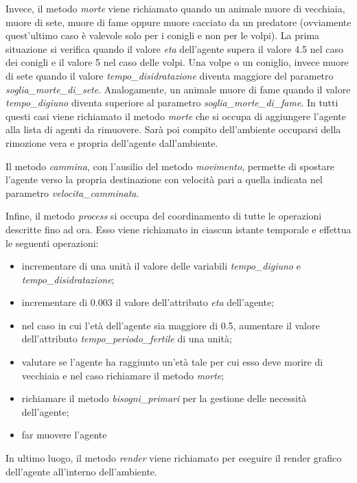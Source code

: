 \documentclass[11pt]{article}
\begin{document}
\vspace{20pt}
\noindent Invece, il metodo \emph{morte} viene richiamato quando un animale muore di vecchiaia, muore di sete, muore di fame oppure muore cacciato da un predatore (ovviamente quest'ultimo caso è valevole solo per i conigli e non per le volpi). La prima situazione si verifica quando il valore \emph{eta} dell'agente supera il valore 4.5 nel caso dei conigli e il valore 5 nel caso delle volpi. Una volpe o un coniglio, invece muore di sete quando il valore \emph{tempo\_disidratazione} diventa maggiore del parametro \emph{soglia\_morte\_di\_sete}. Analogamente, un animale muore di fame quando il valore \emph{tempo\_digiuno} diventa superiore al parametro \emph{soglia\_morte\_di\_fame}. In tutti questi casi viene richiamato il metodo \emph{morte} che si occupa di aggiungere l'agente alla lista di agenti da rimuovere. Sarà poi compito dell'ambiente occuparsi della rimozione vera e propria dell'agente dall'ambiente. 

Il metodo \emph{cammina}, con l'ausilio del metodo \emph{movimento}, permette di spostare l'agente verso la propria destinazione con velocità pari a quella indicata nel parametro \emph{velocita\_camminata}. 

\newpage

Infine, il metodo \emph{process} si occupa del coordinamento di tutte le operazioni descritte fino ad ora. Esso viene richiamato in ciascun istante temporale e effettua le seguenti operazioni:
\begin{itemize}
    \item incrementare di una unità il valore delle variabili \emph{tempo\_digiuno} e \emph{tempo\_disidratazione};
    \item incrementare di 0.003 il valore dell'attributo \emph{eta} dell'agente;
    \item nel caso in cui l'età dell'agente sia maggiore di 0.5, aumentare il valore dell'attributo \emph{tempo\_periodo\_fertile} di una unità;
    \item valutare se l'agente ha raggiunto un'età tale per cui esso deve morire di vecchiaia e nel caso richiamare il metodo \emph{morte};
    \item richiamare il metodo \emph{bisogni\_primari} per la gestione delle necessità dell'agente;
    \item far muovere l'agente
\end{itemize}

In ultimo luogo, il metodo \emph{render} viene richiamato per eseguire il render grafico dell'agente all'interno dell'ambiente.
\end{document}
